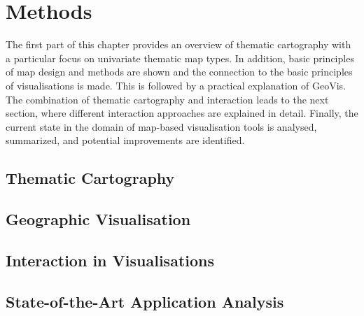 \section{Methods}
\label{s:methods}
The first part of this chapter provides an overview of thematic cartography with a particular focus on univariate thematic map types. In addition, basic principles of map design and methods are shown and the connection to the basic principles of visualisations is made. This is followed by a practical explanation of \ac{GeoVis}.
The combination of thematic cartography and interaction leads to the next section, where different interaction approaches are explained in detail. Finally, the current state in the domain of map-based visualisation tools is analysed, summarized, and potential improvements are identified.

\subsection{Thematic Cartography}
\label{s:cartography}


\subsection{Geographic Visualisation}
\label{s:geovis-practical}


\subsection{Interaction in Visualisations}
\label{s:interaction}


\subsection{State-of-the-Art Application Analysis}
